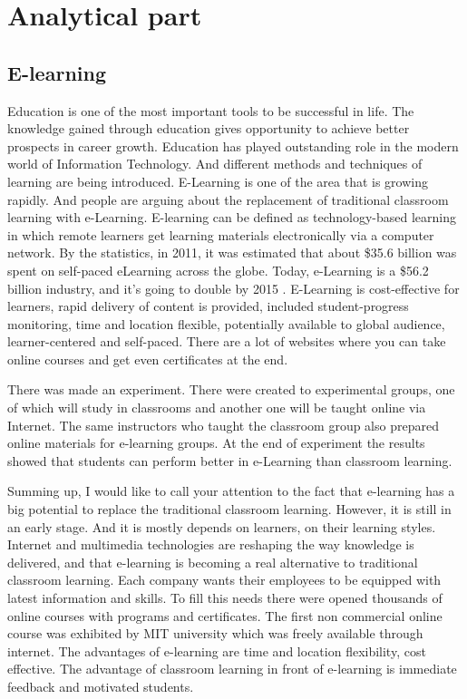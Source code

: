 \chapter{Analytical part}
\label{chap:techniques}



\section{E-learning}

Education is one of the most important tools to be successful in life. The knowledge gained through education gives opportunity to achieve better prospects in career growth. Education has played outstanding role in the modern world of Information Technology. And different methods and techniques of learning are being introduced. E-Learning is one of the area that is growing rapidly. And people are arguing about the replacement of traditional classroom learning with e-Learning.
E-learning can be defined as technology-based learning in which remote learners get learning materials electronically via a computer network. By the statistics, in 2011, it was estimated that about \$35.6 billion was spent on self-paced eLearning across the globe. Today, e-Learning is a \$56.2 billion industry, and it's going to double by 2015 \cite{Pappas}. E-Learning is cost-effective for learners, rapid delivery of content is provided, included student-progress monitoring, time and location flexible, potentially available to global audience, learner-centered and self-paced. There are a lot of websites where you can take online courses and get even certificates at the end. 

There was made an experiment. There were created to experimental groups, one of which will study in classrooms and another one will be taught online via Internet. The same instructors who taught the classroom group also prepared online materials for e-learning groups. At the end of experiment the results showed that students can perform better in e-Learning than classroom learning. \cite{Dansong}

Summing up, I would like to call your attention to the fact that e-learning has a big potential to replace the traditional classroom learning. However, it is still in an early stage. And it is mostly depends on learners, on their learning styles.
Internet and multimedia technologies are reshaping the way knowledge is delivered, and that e-learning is becoming a real alternative to traditional classroom learning. Each company wants their employees to be equipped with latest information and skills. To fill this needs there were opened thousands of online courses with programs and certificates. The first non commercial online course was exhibited by MIT university which was freely available through internet. The advantages of e-learning are time and location flexibility, cost effective. The advantage of classroom learning in front of e-learning is immediate feedback and motivated students.

